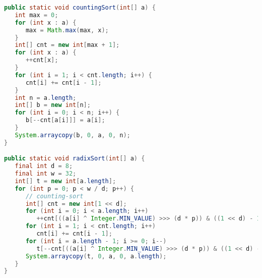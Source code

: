 \begin{lstlisting}[language=Java]
public static void countingSort(int[] a) {
   int max = 0;
   for (int x : a) {
      max = Math.max(max, x);
   }
   int[] cnt = new int[max + 1];
   for (int x : a) {
      ++cnt[x];
   }
   for (int i = 1; i < cnt.length; i++) {
      cnt[i] += cnt[i - 1];
   }
   int n = a.length;
   int[] b = new int[n];
   for (int i = 0; i < n; i++) {
      b[--cnt[a[i]]] = a[i];
   }
   System.arraycopy(b, 0, a, 0, n);
}

public static void radixSort(int[] a) {
   final int d = 8;
   final int w = 32;
   int[] t = new int[a.length];
   for (int p = 0; p < w / d; p++) {
      // counting-sort
	  int[] cnt = new int[1 << d];
      for (int i = 0; i < a.length; i++) 
         ++cnt[((a[i] ^ Integer.MIN_VALUE) >>> (d * p)) & ((1 << d) - 1)];
      for (int i = 1; i < cnt.length; i++)
         cnt[i] += cnt[i - 1];
      for (int i = a.length - 1; i >= 0; i--)
         t[--cnt[((a[i] ^ Integer.MIN_VALUE) >>> (d * p)) & ((1 << d) - 1)]] = a[i];
      System.arraycopy(t, 0, a, 0, a.length);
   }
}
\end{lstlisting}